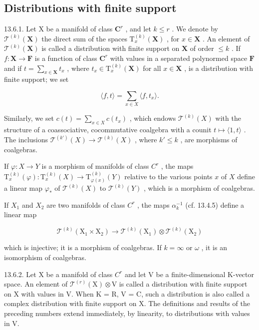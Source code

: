 \subsection{Distributions with finite support}

13.6.1. Let X be a manifold of class \(\mathbf{C}^r\) , and let \(k \leqslant r\) . We denote by \(\mathcal{T}^{(k)}(\mathbf{X})\) the direct sum of the spaces \(\mathrm{T}_x^{(k)}(\mathbf{X})\) , for \(x \in \mathbf{X}\) . An element of \(\mathcal{T}^{(k)}(\mathbf{X})\) is called a distribution with finite support on \(\mathbf{X}\) of order \(\leqslant k\) . If \(f: \mathbf{X} \to \mathbf{F}\) is a function of class \(\mathbf{C}^r\) with values in a separated polynormed space \(\mathbf{F}\) and if \(t = \sum_{x \in \mathbf{X}} t_x\) , where \(t_x \in \mathrm{T}_x^{(k)}(\mathbf{X})\) for all \(x \in \mathbf{X}\) , is a distribution with finite support; we set

\[
\langle f, t \rangle = \sum_ {x \in X} \langle f, t _ {x} \rangle .
\]

Similarly, we set \(c(t) = \sum_{x \in X} c(t_x)\) , which endows \(\mathcal{T}^{(k)}(X)\) with the structure of a coassociative, cocommutative coalgebra with a counit \(t \mapsto \langle 1, t \rangle\) . The inclusions \(\mathcal{T}^{(k')}(X) \to \mathcal{T}^{(k)}(X)\) , where \(k' \leqslant k\) , are morphisms of coalgebras.

If \(\varphi: X \to Y\) is a morphism of manifolds of class \(C^r\) , the maps \(\mathrm{T}_x^{(k)}(\varphi): \mathrm{T}_x^{(k)}(X) \to \mathrm{T}_{\varphi(x)}^{(k)}(Y)\) relative to the various points \(x\) of \(X\) define a linear map \(\varphi_*\) of \(\mathcal{T}^{(k)}(X)\) to \(\mathcal{T}^{(k)}(Y)\) , which is a morphism of coalgebras.

If \(X_{1}\) and \(X_{2}\) are two manifolds of class \(C^{r}\) , the maps \(\alpha_{k}^{-1}\) (cf. 13.4.5) define a linear map

\[
\mathcal {T} ^ {(k)} \left(\mathrm{X} _ {1} \times \mathrm{X} _ {2}\right)\rightarrow \mathcal {T} ^ {(k)} \left(\mathrm{X} _ {1}\right) \otimes \mathcal {T} ^ {(k)} \left(\mathrm{X} _ {2}\right)
\]

which is injective; it is a morphism of coalgebras. If \(k = \infty\) or \(\omega\) , it is an isomorphism of coalgebras.

13.6.2. Let X be a manifold of class \(C^{r}\) and let V be a finite-dimensional K-vector space. An element of \(\mathcal{T}^{(r)}(\mathrm{X})\otimes\mathrm{V}\) is called a distribution with finite support on X with values in V. When K = R, V = C, such a distribution is also called a complex distribution with finite support on X. The definitions and results of the preceding numbers extend immediately, by linearity, to distributions with values in V.

